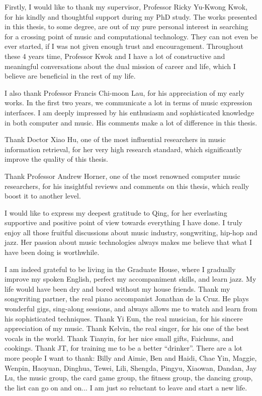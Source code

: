 \begin{acknowledgements}

Firstly, I would like to thank my supervisor, Professor Ricky Yu-Kwong Kwok, for his kindly and thoughtful support during my PhD study. The works presented in this thesis, to some degree, are out of my pure personal interest in searching for a crossing point of music and computational technology. They can not even be ever started, if I was not given enough trust and encouragement. Throughout these 4 years time, Professor Kwok and I have a lot of constructive and meaningful conversations about the dual mission of career and life, which I believe are beneficial in the rest of my life.

I also thank Professor Francis Chi-moon Lau, for his appreciation of my early works. In the first two years, we communicate a lot in terms of music expression interfaces. I am deeply impressed by his enthusiasm and sophisticated knowledge in both computer and music. His comments make a lot of difference in this thesis.

Thank Doctor Xiao Hu, one of the most influential researchers in music information retrieval, for her very high research standard, which significantly improve the quality of this thesis.

Thank Professor Andrew Horner, one of the most renowned computer music researchers, for his insightful reviews and comments on this thesis, which really boost it to another level.

I would like to express my deepest gratitude to Qing, for her everlasting supportive and positive point of view towards everything I have done. I truly enjoy all those fruitful discussions about music industry, songwriting, hip-hop and jazz. Her passion about music technologies always makes me believe that what I have been doing is worthwhile.

I am indeed grateful to be living in the Graduate House, where I gradually improve my spoken English, perfect my accompaniment skills, and learn jazz. My life would have been dry and bored without my house friends. Thank my songwriting partner, the real piano accompanist Jonathan de la Cruz. He plays wonderful gigs, sing-along sessions, and always allows me to watch and learn from his sophisticated techniques. Thank Yi Eun, the real musician, for his sincere appreciation of my music. Thank Kelvin, the real singer, for his one of the best vocals in the world. Thank Tianyin, for her nice small gifts, Faichuns, and cookings. Thank JT, for training me to be a better ``drinker''. There are a lot more people I want to thank: Billy and Aimie, Ben and Haidi, Chae Yin, Maggie, Wenpin, Haoyuan, Dinghua, Tewei, Lili, Shengda, Pingyu, Xiaowan, Dandan, Jay Lu, the music group, the card game group, the fitness group, the dancing group, the list can go on and on... I am just so reluctant to leave and start a new life.


\end{acknowledgements}
